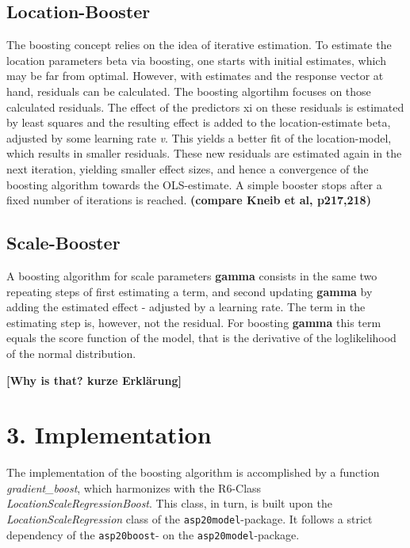\documentclass[
]{report}
\begin{document}
\hypertarget{location-booster}{%
\section{Location-Booster}\label{location-booster}}

The boosting concept relies on the idea of iterative estimation. To
estimate the location parameters beta via boosting, one starts with
initial estimates, which may be far from optimal. However, with
estimates and the response vector at hand, residuals can be calculated.
The boosting algortihm focuses on those calculated residuals. The effect
of the predictors xi on these residuals is estimated by least squares
and the resulting effect is added to the location-estimate beta,
adjusted by some learning rate \emph{v}. This yields a better fit of the
location-model, which results in smaller residuals. These new residuals
are estimated again in the next iteration, yielding smaller effect
sizes, and hence a convergence of the boosting algorithm towards the
OLS-estimate. A simple booster stops after a fixed number of iterations
is reached. \textbf{(compare Kneib et al, p217,218)}

\hypertarget{scale-booster}{%
\section{Scale-Booster}\label{scale-booster}}

A boosting algorithm for scale parameters \textbf{gamma} consists in the
same two repeating steps of first estimating a term, and second updating
\textbf{gamma} by adding the estimated effect - adjusted by a learning
rate. The term in the estimating step is, however, not the residual. For
boosting \textbf{gamma} this term equals the score function of the
model, that is the derivative of the loglikelihood of the normal
distribution.

\textbf{{[}Why is that? kurze Erklärung{]}}

\hypertarget{implementation}{%
\chapter{3. Implementation}\label{implementation}}

The implementation of the boosting algorithm is accomplished by a
function \emph{gradient\_boost}, which harmonizes with the R6-Class
\emph{LocationScaleRegressionBoost}. This class, in turn, is built upon
the \emph{LocationScaleRegression} class of the
\texttt{asp20model}-package. It follows a strict dependency of the
\texttt{asp20boost}- on the \texttt{asp20model}-package.
\end{document}
